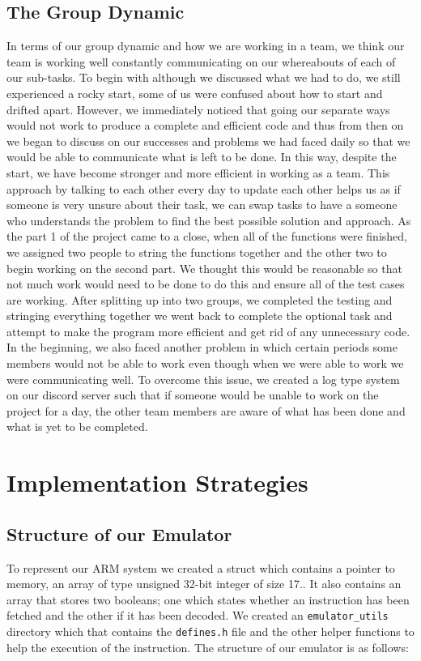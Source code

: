 \documentclass[10pt]{article}
\begin{document}
\subsection{The Group Dynamic}
In terms of our group dynamic and how we are working in a team, we think our team is working well constantly communicating on our whereabouts of each of our sub-tasks. To begin with although we discussed what we had to do, we still experienced a rocky start, some of us were confused about how to start and drifted apart. However, we immediately noticed that going our separate ways would not work to produce a complete and efficient code and thus from then on we began to discuss on our successes and problems we had faced daily so that we would be able to communicate what is left to be done. In this way, despite the start, we have become stronger and more efficient in working as a team. 
 This approach by talking to each other every day to update each other helps us as if someone is very unsure about their task, we can swap tasks to have a someone who understands the problem to find the best possible solution and approach. As the part 1 of the project came to a close, when all of the functions were finished, we assigned two people to string the functions together and the other two to begin working on the second part. We thought this would be reasonable so that not much work would need to be done to do this and ensure all of the test cases are working. After splitting up into two groups, we completed the testing and stringing everything together we went back to complete the optional task and attempt to make the program more efficient and get rid of any unnecessary code.
\\In the beginning, we also faced another problem in which certain periods some members would not be able to work even though when we were able to work we were communicating well. To overcome this issue, we created a log type system on our discord server such that if someone would be unable to work on the project for a day, the other team members are aware of what has been done and what is yet to be completed.

\section{Implementation Strategies}
\subsection{Structure of our Emulator}
To represent our ARM system we created a struct which contains a pointer to memory, an array of type unsigned 32-bit integer of size 17.. It also contains an array that stores two booleans; one which states whether an instruction has been fetched and the other if it has been decoded. We created an {\tt{emulator\_utils}} directory which that contains the {\tt{defines.h}} file and the other helper functions to help the execution of the instruction. The structure of our emulator is as follows:
\end{document}
